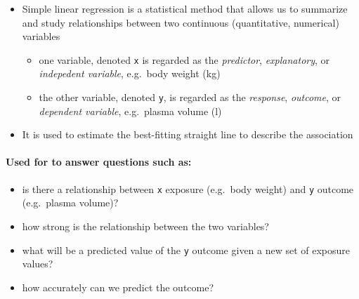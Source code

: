\documentclass[]{article}
\providecommand{\tightlist}{%
  \setlength{\itemsep}{0pt}\setlength{\parskip}{0pt}}
\let\oldparagraph\paragraph
\renewcommand{\paragraph}[1]{\oldparagraph{#1}\mbox{}}
\begin{document}
\begin{itemize}
\tightlist
\item
  Simple linear regression is a statistical method that allows us to
  summarize and study relationships between two continuous
  (quantitative, numerical) variables

  \begin{itemize}
  \tightlist
  \item
    one variable, denoted \texttt{x} is regarded as the
    \emph{predictor}, \emph{explanatory}, or \emph{indepedent variable},
    e.g.~body weight (kg)
  \item
    the other variable, denoted \texttt{y}, is regarded as the
    \emph{response}, \emph{outcome}, or \emph{dependent variable},
    e.g.~plasma volume (l)
  \end{itemize}
\item
  It is used to estimate the best-fitting straight line to describe the
  association
\end{itemize}

\hypertarget{used-for-to-answer-questions-such-as}{%
\paragraph{Used for to answer questions such
as:}\label{used-for-to-answer-questions-such-as}}

\begin{itemize}
\tightlist
\item
  is there a relationship between \texttt{x} exposure (e.g.~body weight)
  and \texttt{y} outcome (e.g.~plasma volume)?
\item
  how strong is the relationship between the two variables?
\item
  what will be a predicted value of the \texttt{y} outcome given a new
  set of exposure values?
\item
  how accurately can we predict the outcome?
\end{itemize}

\newpage
\end{document}
